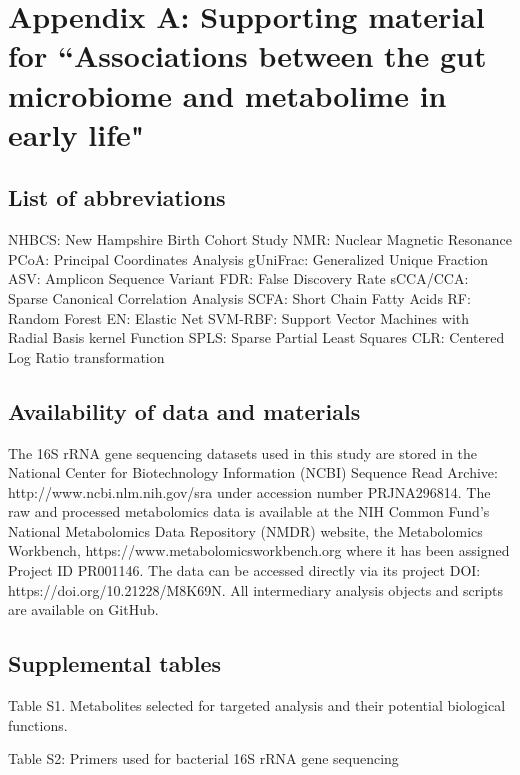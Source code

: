 \chapter{Appendix A: Supporting material for ``Associations between the gut microbiome and metabolime in early life"}

\section{List of abbreviations}
NHBCS: New Hampshire Birth Cohort Study
NMR: Nuclear Magnetic Resonance
PCoA: Principal Coordinates Analysis
gUniFrac: Generalized Unique Fraction 
ASV: Amplicon Sequence Variant
FDR: False Discovery Rate
sCCA/CCA: Sparse Canonical Correlation Analysis
SCFA: Short Chain Fatty Acids
RF: Random Forest
EN: Elastic Net
SVM-RBF: Support Vector Machines with Radial Basis kernel Function
SPLS: Sparse Partial Least Squares
CLR:  Centered Log Ratio transformation

\section{Availability of data and materials}
The 16S rRNA gene sequencing datasets used in this study are stored in the National Center for Biotechnology Information (NCBI) Sequence Read Archive: http://www.ncbi.nlm.nih.gov/sra under accession number PRJNA296814. The raw and processed metabolomics data is available at the NIH Common Fund's National Metabolomics Data Repository (NMDR) website, the Metabolomics Workbench, https://www.metabolomicsworkbench.org where it has been assigned Project ID PR001146. The data can be accessed directly via its project DOI:  https://doi.org/10.21228/M8K69N. All intermediary analysis objects and scripts are available on GitHub. 

\section{Supplemental tables}
Table S1. Metabolites selected for targeted analysis and their potential biological functions.

Table S2: Primers used for bacterial 16S rRNA gene sequencing 

